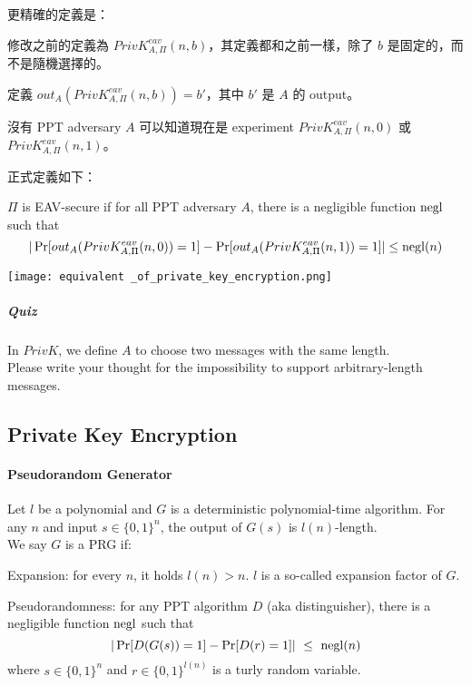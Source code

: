 更精確的定義是：
\begin{myItemize}
	\item 修改之前的定義為 \(PrivK_{A, \Pi}^{eav}(n, b)\)，其定義都和之前一樣，除了 \(b\) 是固定的，而不是隨機選擇的。
	\item 定義 \(out_A(PrivK_{A, \Pi}^{eav}(n, b)) = b'\)，其中 \(b'\) 是 \(A\) 的 output。
	\item 沒有 PPT adversary \(A\) 可以知道現在是 experiment \(PrivK_{A, \Pi}^{eav}(n, 0)\) 或 \(PrivK_{A, \Pi}^{eav}(n, 1)\)。
\end{myItemize}

正式定義如下：
\begin{definition}
	\(\Pi\) is EAV-secure if for all PPT adversary \(A\), there is a negligible function \(\operatorname{negl}\) such that
	\[ | \Pr[out_A(PrivK_{A, \Pi}^{eav}(n, 0)) = 1] -
		 \Pr[out_A(PrivK_{A, \Pi}^{eav}(n,1)) = 1] | \leq \operatorname{negl}(n)\]
\end{definition}

\begin{center}
	\texttt{[image: equivalent \_of\_private\_key\_encryption.png]}
\end{center}

\subparagraph{Quiz}

In \(PrivK\), we define \(A\) to choose two messages with the same length. \\
Please write your thought for the impossibility to support arbitrary-length messages.


\subsection{Private Key Encryption}


\paragraph{Pseudorandom Generator}

\begin{definition}
	Let \(l\) be a polynomial and \(G\) is a deterministic polynomial-time algorithm. For any \(n\) and input \(s \in \{0, 1\}^n\), the output of \(G(s)\) is \(l(n)\)-length. \\
	We say \(G\) is a PRG if:
	\begin{myItemize}
		\item Expansion: for every \(n\), it holds \(l(n) > n\). \(l\) is a so-called expansion factor of \(G\).
		\item Pseudorandomness: for any PPT algorithm \(D\) (aka distinguisher), there is a negligible function \(\operatorname{negl}\) such that
		\[ | \Pr[D(G(s)) = 1] - \Pr[D(r) = 1] | \ \leq \ \negl(n)\]
		where \(s \in \{0, 1\}^n\) and \(r \in \{0, 1\}^{l(n)}\) is a turly random variable.
	\end{myItemize}
\end{definition}


